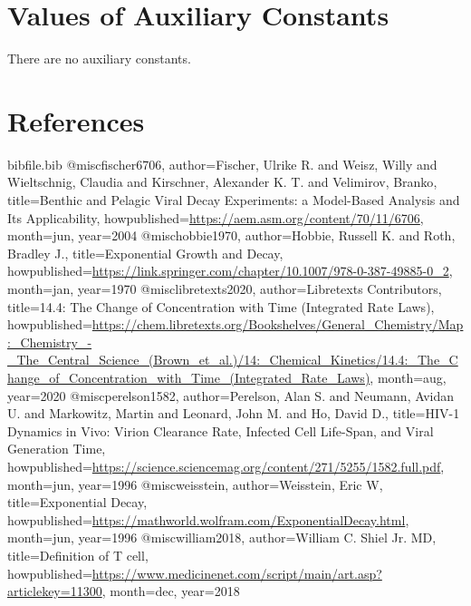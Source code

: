 \documentclass[12pt]{article}
\begin{document}
\section{Values of Auxiliary Constants}
\label{Sec:AuxConstants}
There are no auxiliary constants.

\section{References}
\label{Sec:References}
\begin{filecontents*}{bibfile.bib}
@misc{fischer6706,
author={Fischer, Ulrike R. and Weisz, Willy and Wieltschnig, Claudia and Kirschner, Alexander K. T. and Velimirov, Branko},
title={Benthic and Pelagic Viral Decay Experiments: a Model-Based Analysis and Its Applicability},
howpublished={\url{https://aem.asm.org/content/70/11/6706}},
month=jun,
year={2004}}
@misc{hobbie1970,
author={Hobbie, Russell K. and Roth, Bradley J.},
title={Exponential Growth and Decay},
howpublished={\url{https://link.springer.com/chapter/10.1007/978-0-387-49885-0\_2}},
month=jan,
year={1970}}
@misc{libretexts2020,
author={Libretexts Contributors},
title={14.4: The Change of Concentration with Time (Integrated Rate Laws)},
howpublished={\url{https://chem.libretexts.org/Bookshelves/General\_Chemistry/Map:\_Chemistry\_-\_The\_Central\_Science\_(Brown\_et\_al.)/14:\_Chemical\_Kinetics/14.4:\_The\_Change\_of\_Concentration\_with\_Time\_(Integrated\_Rate\_Laws)}},
month=aug,
year={2020}}
@misc{perelson1582,
author={Perelson, Alan S. and Neumann, Avidan U. and Markowitz, Martin and Leonard, John M. and Ho, David D.},
title={HIV-1 Dynamics in Vivo: Virion Clearance Rate, Infected Cell Life-Span, and Viral Generation Time},
howpublished={\url{https://science.sciencemag.org/content/271/5255/1582.full.pdf}},
month=jun,
year={1996}}
@misc{weisstein,
author={Weisstein, Eric W},
title={Exponential Decay},
howpublished={\url{https://mathworld.wolfram.com/ExponentialDecay.html}},
month=jun,
year={1996}}
@misc{william2018,
author={William C. Shiel Jr. MD},
title={Definition of T cell},
howpublished={\url{https://www.medicinenet.com/script/main/art.asp?articlekey=11300}},
month=dec,
year={2018}}
\end{filecontents*}
\nocite{*}
\printbibliography[heading=none]
\end{document}
